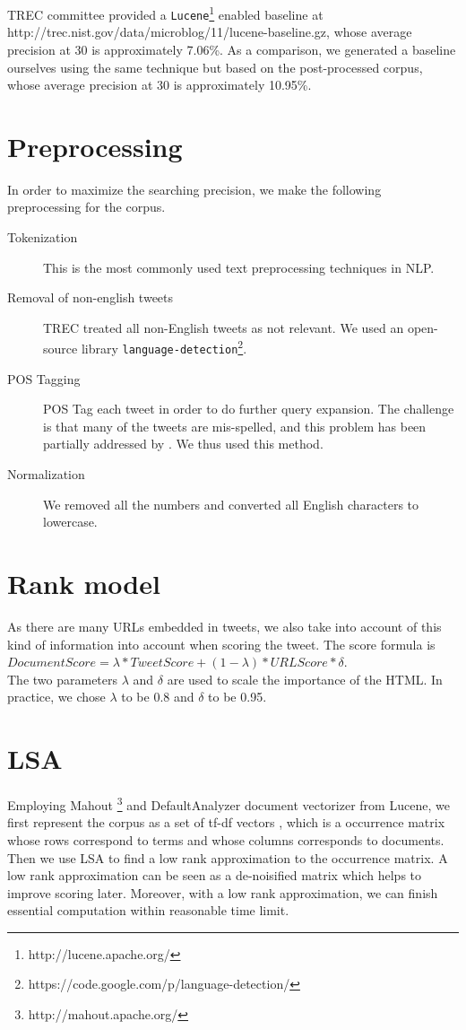 \documentclass{acm_proc_article-sp}
\begin{document}
TREC committee provided a \texttt{Lucene}\footnote{http://lucene.apache.org/} enabled baseline at http://trec.nist.gov/data/microblog/11/lucene-baseline.gz, whose average precision at 30 is approximately 7.06\%. As a comparison, we generated a baseline ourselves using the same technique but based on the post-processed corpus, whose average precision at 30 is approximately 10.95\%.
   
\section{Preprocessing}
In order to maximize the searching precision, we make the following preprocessing for the corpus.
\begin{description}
\item[Tokenization] This is the most commonly used text preprocessing techniques in NLP.
\item[Removal of non-english tweets] TREC treated all non-English tweets as not relevant. We used an open-source library \texttt{language-detection}\footnote{https://code.google.com/p/language-detection/}.
\item[POS Tagging] POS Tag each tweet in order to do further query expansion. The challenge is that many of the tweets are mis-spelled, and this problem has been partially addressed by \cite{owoputi2013improved}. We thus used this method.
\item[Normalization] We removed all the numbers and converted all English characters to lowercase.
\end{description}

\section{Rank model}
As there are many URLs embedded in tweets, we also take into account of this kind of information into account when scoring the tweet. The score formula is\\ $DocumentScore = \lambda*TweetScore + (1-\lambda)*URLScore*\delta$.\\ The two parameters $\lambda$ and $\delta$ are used to scale the importance of the HTML. In practice, we chose $\lambda$ to be 0.8 and $\delta$ to be 0.95.


\section{LSA}
Employing Mahout \footnote{http://mahout.apache.org/} and DefaultAnalyzer document vectorizer from Lucene, we first represent the corpus as a set of tf-df vectors\cite{jones1972statistical} , which is a occurrence matrix whose rows correspond to terms and whose columns corresponds to documents. Then we use LSA\cite{landauer1998introduction} to find a low rank approximation\cite{lra-book} to the occurrence matrix. A low rank approximation can be seen as a de-noisified matrix which helps to improve scoring later. Moreover, with a low rank approximation, we can finish essential computation within reasonable time limit.
\end{document}
